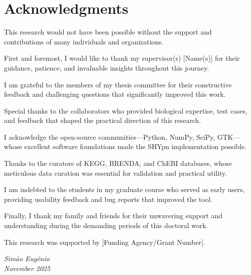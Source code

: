\chapter*{Acknowledgments}


This research would not have been possible without the support and contributions of many individuals and organizations.

First and foremost, I would like to thank my supervisor(s) [Name(s)] for their guidance, patience, and invaluable insights throughout this journey.

I am grateful to the members of my thesis committee for their constructive feedback and challenging questions that significantly improved this work.

Special thanks to the collaborators who provided biological expertise, test cases, and feedback that shaped the practical direction of this research.

I acknowledge the open-source communities---Python, NumPy, SciPy, GTK---whose excellent software foundations made the SHYpn implementation possible.

Thanks to the curators of KEGG, BRENDA, and ChEBI databases, whose meticulous data curation was essential for validation and practical utility.

I am indebted to the students in my graduate course who served as early users, providing usability feedback and bug reports that improved the tool.

Finally, I thank my family and friends for their unwavering support and understanding during the demanding periods of this doctoral work.

This research was supported by [Funding Agency/Grant Number].

\bigskip

\noindent\textit{Simão Eugénio}\\
\noindent\textit{November 2025}
